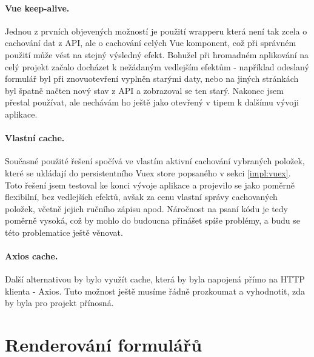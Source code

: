 \paragraph{Vue keep-alive.} Jednou z prvních objevených možností je použití wrapperu \cite{vue-keep-alive} která není tak zcela o cachování dat z API, ale o cachování celých Vue komponent, což při správném použití může vést na stejný výsledný efekt. Bohužel při hromadném aplikování na celý projekt začalo docházet k nežádaným vedlejším efektům - například odeslaný formulář byl při znovuotevření vyplněn starými daty, nebo na jiných stránkách byl špatně načten nový stav z API a zobrazoval se ten starý. Nakonec jsem  přestal používat, ale nechávám ho ještě jako otevřený v tipem k dalšímu vývoji aplikace.

\paragraph{Vlastní cache.} Současné použité řešení spočívá ve vlastím aktivní cachování vybraných položek, které se ukládají do persistentního Vuex store popsaného v sekci \ref{impl:vuex}. Toto řešení jsem testoval ke konci vývoje aplikace a projevilo se jako poměrně flexibilní, bez vedlejších efektů, avšak za cenu vlastní správy cachovaných položek, včetně jejich ručního zápisu apod. Náročnost na psaní kódu je tedy poměrně vysoká, což by mohlo do budoucna přinášet spíše problémy, a budu se této problematice ještě věnovat.

\paragraph{Axios cache.} Další alternativou by bylo využít cache, která by byla napojená přímo na HTTP klienta - Axios. Tuto možnost ještě musíme řádně prozkoumat a vyhodnotit, zda by byla pro projekt přínosná.


\section{Renderování formulářů} \label{implementation:formRender}

